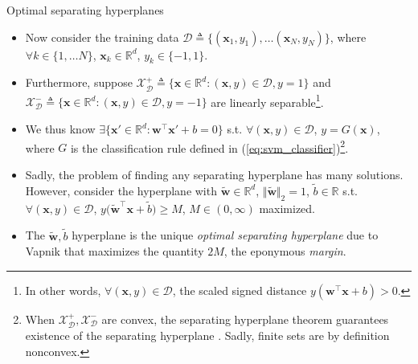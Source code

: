 \documentclass{beamer}
\numberwithin{equation}{section}
\newcommand{\aref}[1]{\alert{\ref{#1}}}
\begin{document}
\begin{frame}{Optimal separating hyperplanes}
    \begin{itemize}
        \item
        Now consider the training data $ \mathcal{D} \triangleq
        \{(\mathbf{x}_1, y_1), \ldots (\mathbf{x}_N, y_N)\} $, where $ \forall
        k \in \{1, \ldots N\} $, $ \mathbf{x}_k \in \mathbb{R}^d $,
        $ y_k \in \{-1, 1\} $.

        \item        
        Furthermore, suppose $ \mathcal{X}_\mathcal{D}^+ \triangleq
        \{\mathbf{x} \in \mathbb{R}^d : (\mathbf{x}, y) \in \mathcal{D},
        y = 1\} $ and $ \mathcal{X}_\mathcal{D}^- \triangleq
        \{\mathbf{x} \in \mathbb{R}^d : (\mathbf{x}, y) \in \mathcal{D},
        y = -1\} $ are linearly separable\footnote{
            In other words, $ \forall (\mathbf{x}, y) \in \mathcal{D} $,
            the scaled signed distance
            $ y(\mathbf{w}^\top\mathbf{x} + b) > 0 $.
        }.

        \item
        We thus know $ \exists \{\mathbf{x}' \in \mathbb{R}^d :
        \mathbf{w}^\top\mathbf{x}' + b = 0\} $ s.t. $ \forall (\mathbf{x}, y)
        \in \mathcal{D} $, $ y = G(\mathbf{x}) $, where $ G $ is the
        classification rule defined in (\aref{eq:svm_classifier})\footnote{
            When $ \mathcal{X}_\mathcal{D}^+, \mathcal{X}_\mathcal{D}^- $ are
            convex, the separating hyperplane theorem guarantees existence
            of the separating hyperplane \cite{bv_convex_opt}. Sadly,
            finite sets are by definition nonconvex.
        }.

        \item
        Sadly, the problem of finding \alert{any} separating hyperplane has
        many solutions. However, consider the hyperplane with
        $ \tilde{\mathbf{w}} \in \mathbb{R}^d $,
        $ \Vert\tilde{\mathbf{w}}\Vert_2 = 1 $, $ \tilde{b} \in \mathbb{R} $
        s.t. $ \forall (\mathbf{x}, y) \in \mathcal{D} $,
        $ y\big(\tilde{\mathbf{w}}^\top\mathbf{x} + \tilde{b}\big) \ge M $,
        $ M \in (0, \infty) $ maximized.

        \item
        The $ \tilde{\mathbf{w}}, \tilde{b} $ hyperplane is the \alert{unique}
        \textit{optimal separating hyperplane} due to Vapnik that maximizes
        the quantity $ 2M $, the eponymous \textit{margin}.
    \end{itemize}

    \medskip
\end{frame}
\end{document}
